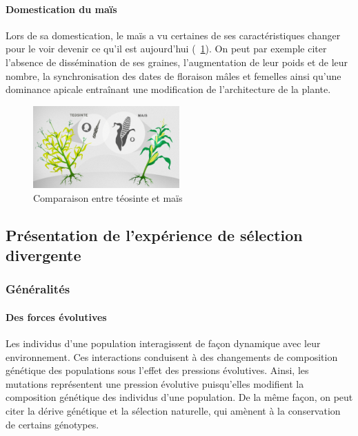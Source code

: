 \documentclass[12pt,a4paper]{article}
\begin{document}
						\paragraph{Domestication du maïs} 
							Lors de sa domestication, le maïs a vu certaines de ses caractéristiques changer pour le voir devenir ce qu'il est aujourd'hui (~\ref{Comparaison entre téosinte et maïs}). On peut par exemple citer l'absence de dissémination de ses graines, l'augmentation de leur poids et de leur nombre, la synchronisation des dates de floraison mâles et femelles ainsi qu'une dominance apicale entraînant une modification de l'architecture de la plante.
							\begin{figure}[h]
								\centering
								\includegraphics[width=0.5\textwidth]{comparaison.jpg}
								\caption{Comparaison entre téosinte et maïs}
								\label{Comparaison entre téosinte et maïs}
							\end{figure}
	
						
						
			        \subsection{Présentation de l'expérience de sélection divergente}
				
					\subsubsection{Généralités}
						
						\paragraph{Des forces évolutives}
							Les individus d'une population interagissent de façon dynamique avec leur environnement. Ces interactions conduisent à des changements de composition génétique des populations sous l'effet des pressions évolutives. Ainsi, les mutations représentent une pression évolutive puisqu'elles modifient la composition génétique des individus d'une population. De la même façon, on peut citer la dérive génétique et la sélection naturelle, qui amènent à la conservation de certains génotypes.
							
\end{document}
